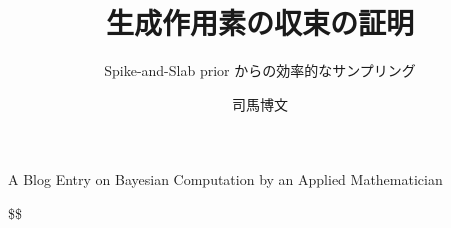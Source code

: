 \documentclass[
]{article}
\title{生成作用素の収束の証明}
\subtitle{Spike-and-Slab prior からの効率的なサンプリング}
\author{司馬博文}
\date{}
\theoremstyle{StatementsWithUnderline}\newtheorem{theorem}{定理}[section]\newtheorem{definition}[theorem]{定義}\newtheorem{corollary}[theorem]{系}\newtheorem{proposition}[theorem]{命題}\newtheorem{lemma}[theorem]{補題}\newtheorem{example}[theorem]{例}
\theoremstyle{definition}\newtheorem{notation}[theorem]{記法}\newtheorem{algorithm}[theorem]{算譜}\newtheorem{remarks}[theorem]{要諦}\newtheorem{remark}[theorem]{注}
\begin{document}
\maketitle

A Blog Entry on Bayesian Computation by an Applied Mathematician

\$\$

\renewcommand{\P}{\operatorname{P}}\newcommand{\E}{\operatorname{E}}
\newcommand{\R}{\mathbb{R}}\newcommand{\F}{\mathcal{F}}
\newcommand{\abs}[1]{\lvert#1\rvert}\newcommand{\Abs}[1]{\left|#1\right|}\newcommand{\ABs}[1]{\biggl|#1\biggr|}\newcommand{\norm}[1]{\|#1\|}\newcommand{\Norm}[1]{\left\|#1\right\|}\newcommand{\NOrm}[1]{\biggl\|#1\biggr\|}\newcommand{\Brace}[1]{\left\{#1\right\}}\newcommand{\BRace}[1]{\biggl\{#1\biggr\}}\newcommand{\paren}[1]{\left(#1\right)}\newcommand{\Paren}[1]{\biggr(#1\biggl)}\newcommand{\brac}[1]{\langle#1\rangle}\newcommand{\Brac}[1]{\left\langle#1\right\rangle}\newcommand{\BRac}[1]{\biggl\langle#1\biggr\rangle}\newcommand{\bra}[1]{\left\langle#1\right|}\newcommand{\ket}[1]{\left|#1\right\rangle}\newcommand{\Square}[1]{\left[#1\right]}\newcommand{\SQuare}[1]{\biggl[#1\biggr]}\newcommand{\rN}{\mathrm{N}}\newcommand{\ov}[1]{\overline{#1}}\newcommand{\un}[1]{\underline{#1}}\newcommand{\wt}[1]{\widetilde{#1}}\newcommand{\wh}[1]{\widehat{#1}}\newcommand{\pp}[2]{\frac{\partial #1}{\partial #2}}\newcommand{\ppp}[3]{\frac{\partial #1}{\partial #2\partial #3}}\newcommand{\dd}[2]{\frac{d #1}{d #2}}\newcommand{\floor}[1]{\lfloor#1\rfloor}\newcommand{\Floor}[1]{\left\lfloor#1\right\rfloor}\newcommand{\ceil}[1]{\lceil#1\rceil}\newcommand{\ocinterval}[1]{(#1]}\newcommand{\cointerval}[1]{[#1)}\newcommand{\COinterval}[1]{\left[#1\right)}\newcommand{\iso}{\overset{\sim}{\to}}

\newcommand{\y}{\b{y}}\newcommand{\mi}{\,|\,}\newcommand{\Mark}{\mathrm{Mark}}
\newcommand{\argmax}{\operatorname*{argmax}}\newcommand{\argmin}{\operatorname*{argmin}}

\newcommand{\pr}{\mathrm{pr}}
\newcommand{\Map}{\mathrm{Map}}\newcommand{\dom}{\mathrm{Dom}\;}\newcommand{\cod}{\mathrm{Cod}\;}\newcommand{\supp}{\mathrm{supp}\;}
\newcommand{\grad}{\operatorname{grad}}\newcommand{\rot}{\operatorname{rot}}\renewcommand{\div}{\operatorname{div}}\newcommand{\tr}{\operatorname{tr}}\newcommand{\Tr}{\operatorname{Tr}}\newcommand{\KL}{\operatorname{KL}}\newcommand{\JS}{\operatorname{JS}}\newcommand{\ESS}{\operatorname{ESS}}\newcommand{\MSE}{\operatorname{MSE}}\newcommand{\erf}{\operatorname{erf}}\newcommand{\arctanh}{\operatorname{arctanh}}\newcommand{\pl}{\operatorname{pl}}\newcommand{\minimize}{\operatorname{minimize}}\newcommand{\subjectto}{\operatorname{subject to}}\newcommand{\sinc}{\operatorname{sinc}}\newcommand{\Ent}{\operatorname{Ent}}\newcommand{\Polya}{\operatorname{Polya}}\newcommand{\Exp}{\operatorname{Exp}}\newcommand{\codim}{\operatorname{codim}}\newcommand{\sgn}{\operatorname{sgn}}\newcommand{\rank}{\operatorname{rank}}
\end{document}
